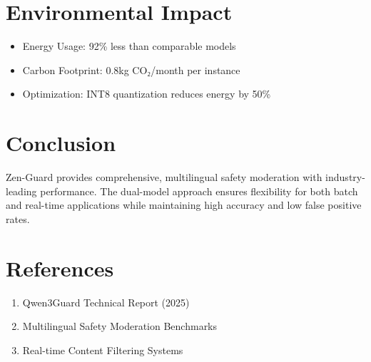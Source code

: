 \documentclass[11pt]{article}
\begin{document}
\section{Environmental Impact}

\begin{itemize}
\item Energy Usage: 92\% less than comparable models
\item Carbon Footprint: 0.8kg CO₂/month per instance
\item Optimization: INT8 quantization reduces energy by 50\%
\end{itemize}

\section{Conclusion}

Zen-Guard provides comprehensive, multilingual safety moderation with industry-leading performance. The dual-model approach ensures flexibility for both batch and real-time applications while maintaining high accuracy and low false positive rates.

\section{References}

\begin{enumerate}
\item Qwen3Guard Technical Report (2025)
\item Multilingual Safety Moderation Benchmarks
\item Real-time Content Filtering Systems
\end{enumerate}
\end{document}
